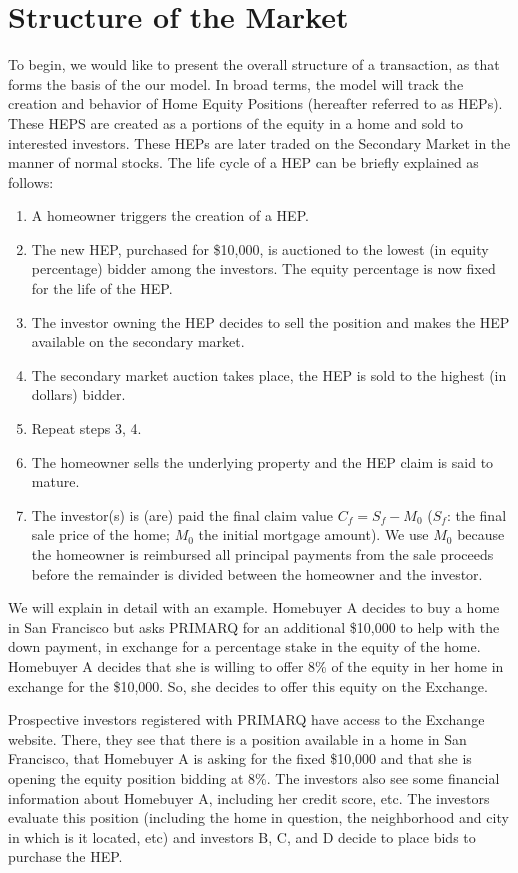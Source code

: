 \documentclass[twoside]{article}
\begin{document}
\section{Structure of the Market}
To begin, we would like to present the overall structure of a transaction, as that forms the basis of the our model.  In broad terms, the model will track the creation and behavior of Home Equity Positions (hereafter referred to as HEPs). These HEPS are created as a portions of the equity in a home and sold to interested investors. These HEPs are later traded on the Secondary Market in the manner of normal stocks. The life cycle of a HEP can be briefly explained as follows:

\begin{enumerate}
\item{A homeowner triggers the creation of a HEP.}
\item{The new HEP, purchased for \$10,000, is auctioned to the lowest (in equity percentage) bidder among the investors. The equity percentage is now fixed for the life of the HEP.}
\item{The investor owning the HEP decides to sell the position and makes the HEP available on the secondary market.}
\item{The secondary market auction takes place, the HEP is sold to the highest (in dollars) bidder.}
\item{Repeat steps 3, 4.}
\item{The homeowner sells the underlying property and the HEP claim is said to mature.}
\item{The investor(s) is (are) paid the final claim value $C_f = S_f - M_0$ ($S_f$: the final sale price of the home; $M_0$ the initial mortgage amount). We use $M_0$ because the homeowner is reimbursed all principal payments from the sale proceeds before the remainder is divided between the homeowner and the investor.}
\end{enumerate}

We will explain in detail with an example. Homebuyer A decides to buy a home in San Francisco but asks PRIMARQ for an additional \$10,000 to help with the down payment, in exchange for a percentage stake in the equity of the home. Homebuyer A decides that she is willing to offer 8\% of the equity in her home in exchange for the \$10,000. So, she decides to offer this equity on the Exchange. 

Prospective investors registered with PRIMARQ have access to the Exchange website. There, they see that there is a position available in a home in San Francisco, that Homebuyer A is asking for the fixed \$10,000 and that she is opening the equity position bidding at 8\%. The investors also see some financial information about Homebuyer A, including her credit score, etc. The investors evaluate this position (including the home in question, the neighborhood and city in which is it located, etc) and investors B, C, and D decide to place bids to purchase the HEP.
\end{document}
